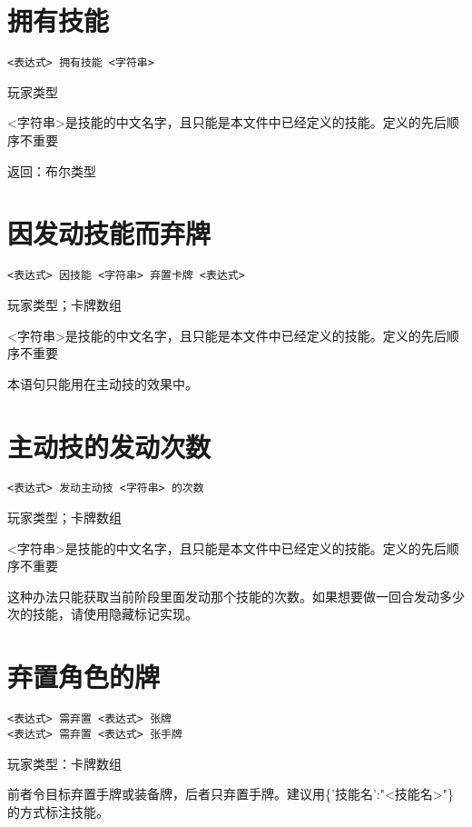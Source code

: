 \section{拥有技能}

\begin{verbatim}
<表达式> 拥有技能 <字符串>
\end{verbatim}

玩家类型

<字符串>是技能的中文名字，且只能是本文件中已经定义的技能。定义的先后顺序不重要

返回：布尔类型

\section{因发动技能而弃牌}

\begin{verbatim}
<表达式> 因技能 <字符串> 弃置卡牌 <表达式>
\end{verbatim}

玩家类型；卡牌数组

<字符串>是技能的中文名字，且只能是本文件中已经定义的技能。定义的先后顺序不重要

本语句只能用在主动技的效果中。

\section{主动技的发动次数}

\begin{verbatim}
<表达式> 发动主动技 <字符串> 的次数
\end{verbatim}

玩家类型；卡牌数组

<字符串>是技能的中文名字，且只能是本文件中已经定义的技能。定义的先后顺序不重要

这种办法只能获取当前阶段里面发动那个技能的次数。如果想要做一回合发动多少次的技能，请使用隐藏标记实现。

\section{弃置角色的牌}

\begin{verbatim}
<表达式> 需弃置 <表达式> 张牌
<表达式> 需弃置 <表达式> 张手牌
\end{verbatim}

玩家类型：卡牌数组

前者令目标弃置手牌或装备牌，后者只弃置手牌。建议用\{'技能名':"<技能名>"\}的方式标注技能。


